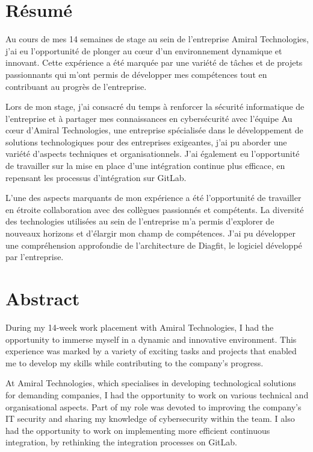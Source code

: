\section*{Résumé}
Au cours de mes 14 semaines de stage au sein de l'entreprise Amiral Technologies, j'ai eu l'opportunité de plonger au cœur d'un environnement dynamique et innovant.
Cette expérience a été marquée par une variété de tâches et de projets passionnants qui m'ont permis de développer mes compétences tout en contribuant au progrès de l'entreprise.


Lors de mon stage, j'ai consacré du temps à renforcer la sécurité informatique de l'entreprise et à partager mes connaissances en cybersécurité avec l'équipe
Au cœur d'Amiral Technologies, une entreprise spécialisée dans le développement de solutions technologiques pour des entreprises exigeantes, j'ai pu aborder une variété d'aspects techniques et organisationnels.
J'ai également eu l'opportunité de travailler sur la mise en place d'une intégration continue plus efficace, en repensant les processus d'intégration sur GitLab.

L'une des aspects marquants de mon expérience a été l'opportunité de travailler en étroite collaboration avec des collègues passionnés et compétents.
La diversité des technologies utilisées au sein de l'entreprise m'a permis d'explorer de nouveaux horizons et d'élargir mon champ de compétences.
J'ai pu développer une compréhension approfondie de l'architecture de Diagfit, le logiciel développé par l'entreprise.

\section*{Abstract}
During my 14-week work placement with Amiral Technologies, I had the opportunity to immerse myself in a dynamic and innovative environment.
This experience was marked by a variety of exciting tasks and projects that enabled me to develop my skills while contributing to the company's progress.

At Amiral Technologies, which specialises in developing technological solutions for demanding companies, I had the opportunity to work on various technical and organisational aspects.
Part of my role was devoted to improving the company's IT security and sharing my knowledge of cybersecurity within the team.
I also had the opportunity to work on implementing more efficient continuous integration, by rethinking the integration processes on GitLab.


